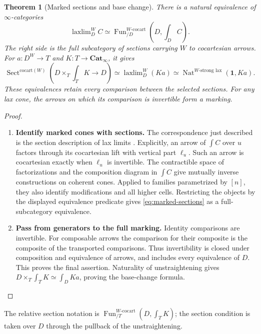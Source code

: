 \documentclass[oneside]{article}
\theoremstyle{plain}
\newtheorem{theorem}{Theorem}[section]
\theoremstyle{definition}
\theoremstyle{remark}
\newcommand{\Cat}{\mathbf{Cat}_{\infty}}
\newcommand{\Fun}{\operatorname{Fun}}
\newcommand{\coc}{\mathrm{cocart}}
\newcommand{\laxlim}{\mathop{\mathrm{laxlim}}}
\newcommand{\one}{\mathbf 1}
\begin{document}
\begin{theorem}[Marked sections and base change]
\label{prop:marked-sections}\label{thm:marked-base-change}
There is a natural equivalence of $\infty$-categories
\begin{equation}\label{eq:marked-sections}
 \laxlim\nolimits_D^W C\simeq
 \Fun^{W\text{-}\coc}_{/D}\left(D,\int_D C\right).
\end{equation}
The right side is the full subcategory of sections carrying $W$ to
cocartesian arrows. For $a:D^W\to T$ and $K:T\to\Cat$, it gives
\[
 \operatorname{Sect}^{\coc(W)}
 (D\times_T\textstyle\int_TK\to D)
 \simeq\laxlim_D^W(Ka)
 \simeq\operatorname{Nat}^{W\text{-strong lax}}(\one,Ka).
\]
These equivalences retain every comparison between the selected sections.
For any lax cone, the arrows on which its comparison is invertible form
a marking.
\end{theorem}
\begin{proof}
\leavevmode
\begin{enumerate}
\item \textbf{Identify marked cones with sections.} The correspondence just described is the section description of lax limits
\cite{Berman2020,HHLN2023}. Explicitly, an arrow of $\int C$ over $u$
factors through its cocartesian lift with vertical part $\ell_u$. Such an
arrow is cocartesian exactly when $\ell_u$ is invertible. The contractible
space of factorizations and the composition diagram in $\int C$ give
mutually inverse constructions on coherent cones. Applied to families
parametrized by $[n]$, they also identify modifications and all higher
cells. Restricting the objects by the displayed equivalence predicate gives
\eqref{eq:marked-sections} as a full-subcategory equivalence.
\item \textbf{Pass from generators to the full marking.} Identity comparisons are invertible. For composable arrows the comparison
for their composite is the composite of the transported comparisons.
Thus invertibility is closed under composition and equivalence of arrows,
and includes every equivalence of $D$. This proves the final assertion. Naturality of unstraightening gives
$D\times_T\int_TK\simeq\int_DKa$, proving the base-change formula.\qedhere
\end{enumerate}
\end{proof}

The relative section notation is
$\Fun^{W\text{-}\coc}_{/T}(D,\int_TK)$; the section condition is taken
over $D$ through the pullback of the unstraightening.
\end{document}
